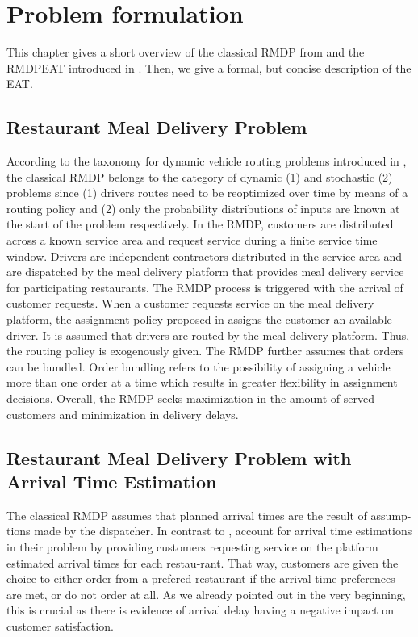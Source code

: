 \chapter{Problem formulation}

This chapter gives a short overview of the classical RMDP from \cite{UlmerRMDP} and the RMDPEAT introduced in \cite{Hildebrandt2020_EAT}. Then, we give a formal, but concise description of the EAT.
\section{Restaurant Meal Delivery Problem}

According to the taxonomy for dynamic vehicle routing problems introduced in \cite{psaraftis}, the classical RMDP belongs to the category of dynamic (1) and stochastic (2) problems since (1) drivers routes need to be reoptimized over time by means of a routing policy and (2) only the probability distributions of inputs are known at the start of the problem respectively. In the RMDP, customers are distributed across a known service area and request service during a finite service time window. Drivers are independent contractors distributed in the service area and are dispatched by the meal delivery platform that provides meal delivery service for participating restaurants. The RMDP process is triggered with the arrival of customer requests. When a customer requests service on the meal delivery platform, the assignment policy proposed in \cite{UlmerRMDP} assigns the customer an available driver. It is assumed that drivers are routed by the meal delivery platform. Thus, the routing policy is exogenously given. The RMDP further assumes that orders can be bundled. Order bundling refers to the possibility of assigning a vehicle more than one order at a time which results in greater flexibility in assignment decisions. Overall, the RMDP seeks maximization in the amount of served customers and minimization in delivery delays.



\section{Restaurant Meal Delivery Problem with Arrival Time Estimation}

The classical RMDP assumes that planned arrival times are the result of assump-tions made by the dispatcher. In contrast to \citet{UlmerRMDP}, \citet{Hildebrandt2020_EAT} account for arrival time estimations in their problem by providing customers requesting service on the platform estimated arrival times for each restau-rant. That way, customers are given the choice to either order from a prefered restaurant if the arrival time preferences are met, or do not order at all. As we already pointed out in the very beginning, this is crucial as there is evidence of arrival delay having a negative impact on customer satisfaction. 

